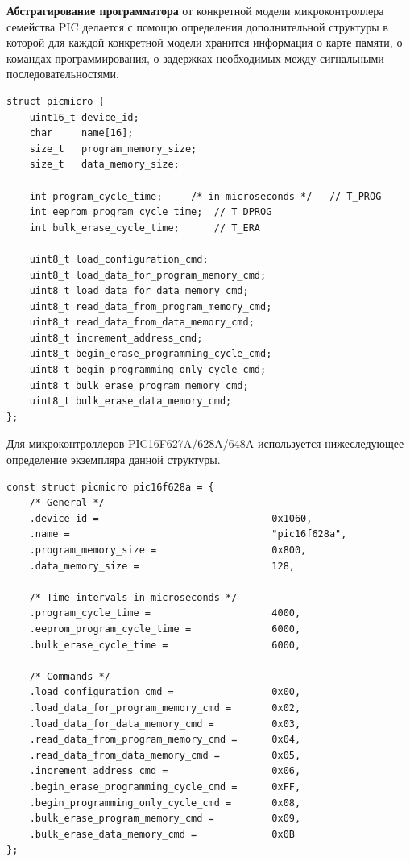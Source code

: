\textbf{Абстрагирование программатора} от конкретной модели микроконтроллера семейства PIC 
делается с помощю определения дополнительной структуры в которой для каждой конкретной модели 
хранится информация о карте памяти, о командах программирования, о задержках необходимых между 
сигнальными последовательностями.

\begin{small}
\begin{verbatim}
struct picmicro {
    uint16_t device_id;
    char     name[16];
    size_t   program_memory_size;
    size_t   data_memory_size;

    int program_cycle_time;     /* in microseconds */   // T_PROG
    int eeprom_program_cycle_time;  // T_DPROG
    int bulk_erase_cycle_time;      // T_ERA

    uint8_t load_configuration_cmd;
    uint8_t load_data_for_program_memory_cmd;
    uint8_t load_data_for_data_memory_cmd;
    uint8_t read_data_from_program_memory_cmd;
    uint8_t read_data_from_data_memory_cmd;
    uint8_t increment_address_cmd;
    uint8_t begin_erase_programming_cycle_cmd;
    uint8_t begin_programming_only_cycle_cmd;
    uint8_t bulk_erase_program_memory_cmd;
    uint8_t bulk_erase_data_memory_cmd;
};
\end{verbatim}
\end{small}

Для микроконтроллеров PIC16F627A/628A/648A используется нижеследующее определение экземпляра данной структуры.
\begin{small}
\begin{verbatim}
const struct picmicro pic16f628a = {
    /* General */
    .device_id =                              0x1060,
    .name =                                   "pic16f628a",
    .program_memory_size =                    0x800,
    .data_memory_size =                       128,
    
    /* Time intervals in microseconds */
    .program_cycle_time =                     4000,
    .eeprom_program_cycle_time =              6000,
    .bulk_erase_cycle_time =                  6000,
    
    /* Commands */
    .load_configuration_cmd =                 0x00,
    .load_data_for_program_memory_cmd =       0x02,
    .load_data_for_data_memory_cmd =          0x03,
    .read_data_from_program_memory_cmd =      0x04,
    .read_data_from_data_memory_cmd =         0x05,
    .increment_address_cmd =                  0x06,
    .begin_erase_programming_cycle_cmd =      0xFF,
    .begin_programming_only_cycle_cmd =       0x08,
    .bulk_erase_program_memory_cmd =          0x09,
    .bulk_erase_data_memory_cmd =             0x0B
};
\end{verbatim}
\end{small}


